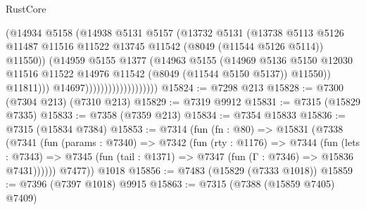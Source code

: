 \begin{lexlean}{RustCore}
\begin{coremodule}
                                          (@14934
                                            @5158
                                            (@14938
                                              @5131
                                              @5157
                                              (@13732
                                                @5131
                                                (@13738
                                                  @5113
                                                  @5126
                                                  @11487
                                                  @11516
                                                  @11522
                                                  @13745
                                                  @11542
                                                  (@8049 (@11544 @5126 @5114))
                                                  @11550))
                                              (@14959
                                                @5155
                                                @1377
                                                (@14963
                                                  @5155
                                                  (@14969
                                                    @5136
                                                    @5150
                                                    @12030
                                                    @11516
                                                    @11522
                                                    @14976
                                                    @11542
                                                    (@8049 (@11544 @5150 @5137))
                                                    @11550))
                                                @11811)))
                                          @14697)))))))))))))))))))
@15824 := @7298 @213
@15828 := @7300 (@7304 @213) (@7310 @213)
@15829 := @7319 @9912
@15831 := @7315 (@15829 @7335)
@15833 := @7358 (@7359 @213)
@15834 := @7354 @15833
@15836 := @7315 (@15834 @7384)
@15853 := @7314
    (fun (fn : @80) =>
    @15831
      (@7338
        (@7341
          (fun (params : @7340) =>
          @7342
            (fun (rty : @1176) =>
            @7344
              (fun (lets : @7343) =>
              @7345 (fun (tail : @1371) => @7347 (fun (Γ : @7346) => @15836 @7431))))))
        @7477))
    @1018
@15856 := @7483 (@15829 (@7333 @1018))
@15859 := @7396 (@7397 @1018) @9915
@15863 := @7315 (@7388 (@15859 @7405) @7409)

\end{coremodule}
\end{lexlean}
